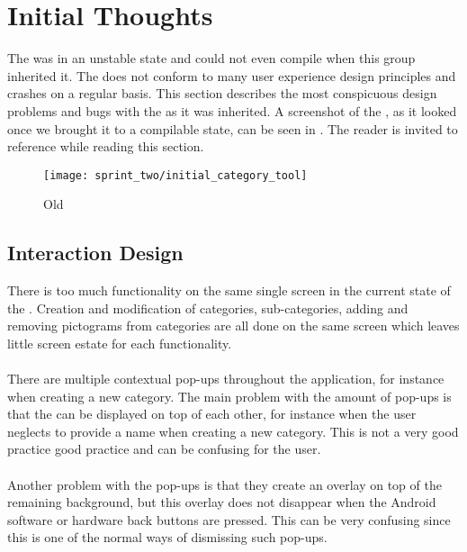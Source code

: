 \section{Initial Thoughts}

The \ct was in an unstable state and could not even compile when this group inherited it. The \ct does not conform to many user experience design principles and crashes on a regular basis. This section describes the most conspicuous design problems and  bugs with the \ct as it was inherited. A screenshot of the \ct, as it looked once we brought it to a compilable state, can be seen in . The reader is invited to reference  while reading this section.

\begin{figure}[!htbp]
    \centering
    \texttt{[image: sprint\_two/initial\_category\_tool]}
    \caption{Old \ct}
    \label{fig:category_tool_old}
\end{figure}

\subsection{Interaction Design}

There is too much functionality on the same single screen in the current state of the \ct. Creation and modification of categories, sub-categories, adding and removing pictograms from categories are all done on the same screen which leaves little screen estate for each functionality.
\\\\
There are multiple contextual pop-ups throughout the application, for instance when creating a new category. The main problem with the amount of pop-ups is that the can be displayed on top of each other, for instance when the user neglects to provide a name when creating a new category. This is not a very good practice good practice and can be confusing for the user.
\\\\
Another problem with the pop-ups is that they create an overlay on top of the remaining background, but this overlay does not disappear when the Android software or hardware back buttons are pressed. This can be very confusing since this is one of the normal ways of dismissing such pop-ups.

